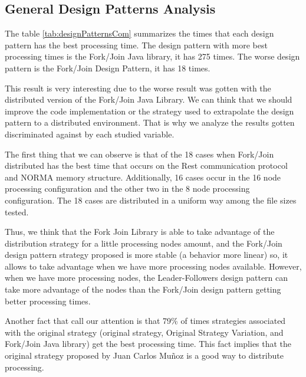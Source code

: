\subsection{General Design Patterns Analysis}
\label{subsec:designPatternsAnalysis}

The table \ref{tab:designPatternsCom} summarizes the times that each design pattern has the best processing time. The design pattern with more best processing times is the Fork/Join Java library, it has 275 times. The worse design pattern is the Fork/Join Design Pattern, it has 18 times.

This result is very interesting due to the worse result was gotten with the distributed version of the Fork/Join Java Library. We can think that we should improve the code implementation or the strategy used to extrapolate the design pattern to a distributed environment. That is why we analyze the results gotten discriminated against by each studied variable.

The first thing that we can observe is that of the 18 cases when Fork/Join distributed has the best time that occurs on the Rest communication protocol and NORMA memory structure. Additionally, 16 cases occur in the 16 node processing configuration and the other two in the 8 node processing configuration. The 18 cases are distributed in a uniform way among the file sizes tested.

Thus, we think that the Fork Join Library is able to take advantage of the distribution strategy for a little processing nodes amount, and the Fork/Join design pattern strategy proposed is more stable (a behavior more linear) so, it allows to take advantage when we have more processing nodes available. However, when we have more processing nodes, the Leader-Followers design pattern can take more advantage of the nodes than the Fork/Join design pattern getting better processing times.

Another fact that call our attention is that 79\% of times strategies associated with the original strategy (original strategy, Original Strategy Variation, and Fork/Join Java library) get the best processing time. This fact implies that the original strategy proposed by Juan Carlos Muñoz is a good way to distribute processing.

